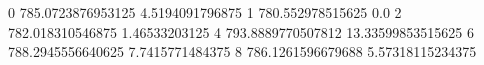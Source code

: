 0 785.0723876953125 4.5194091796875
1 780.552978515625 0.0
2 782.018310546875 1.46533203125
4 793.8889770507812 13.33599853515625
6 788.2945556640625 7.7415771484375
8 786.1261596679688 5.57318115234375
